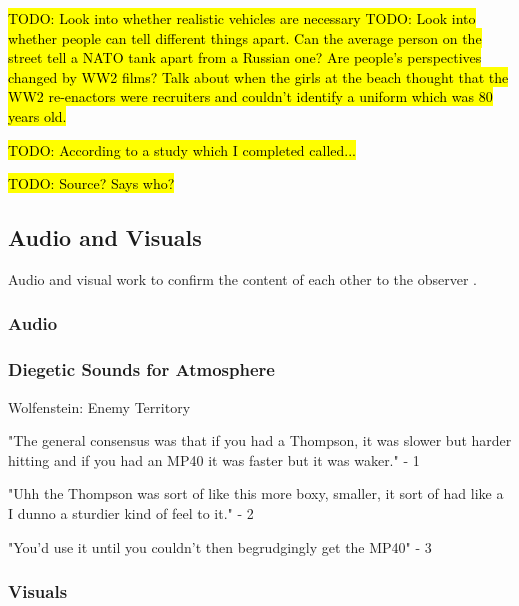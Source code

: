 \documentclass{article}
\begin{document}
\hl{TODO: Look into whether realistic vehicles are necessary
TODO: Look into whether people can tell different things apart. Can the average person on the street tell a NATO tank apart from a Russian one? Are people's perspectives changed by WW2 films? Talk about when the girls at the beach thought that the WW2 re-enactors were recruiters and couldn't identify a uniform which was 80 years old.}

\hl{TODO: According to a study which I completed called... }

\hl{TODO: Source? Says who?}

\subsection{Audio and Visuals}

Audio and visual work to confirm the content of each other to the observer \cite{diegeticSounds1}. 

\subsubsection{Audio}

\subsubsection{Diegetic Sounds for Atmosphere}

 \cite{diegeticSounds1}



Wolfenstein: Enemy Territory


"The general consensus was that if you had a Thompson, it was slower but harder hitting and if you had an MP40 it was faster but it was waker." - 1

"Uhh the Thompson was sort of like this more boxy, smaller, it sort of had like a I dunno a sturdier kind of feel to it." - 2

"You'd use it until you couldn't then begrudgingly get the MP40" - 3

\subsubsection{Visuals}
\end{document}
